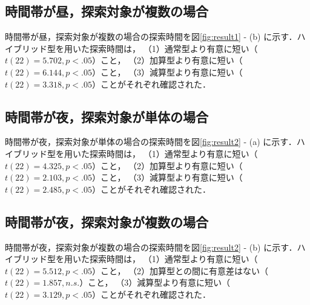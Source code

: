   \subsection{時間帯が昼，探索対象が複数の場合}
    時間帯が昼，探索対象が複数の場合の探索時間を図\ref{fig:result1} - (b) に示す．ハイブリッド型を用いた探索時間は，
    （1）通常型より有意に短い（$t(22)=5.702,p<.05$）こと，
    （2）加算型より有意に短い（$t(22)=6.144,p<.05$）こと，
    （3）減算型より有意に短い（$t(22)=3.318,p<.05$）ことがそれぞれ確認された．

  \subsection{時間帯が夜，探索対象が単体の場合}
    時間帯が夜，探索対象が単体の場合の探索時間を図\ref{fig:result2} - (a) に示す．ハイブリッド型を用いた探索時間は，
    （1）通常型より有意に短い（$t(22)=4.325,p<.05$）こと，
    （2）加算型より有意に短い（$t(22)=2.103,p<.05$）こと，
    （3）減算型より有意に短い（$t(22)=2.485,p<.05$）ことがそれぞれ確認された．

  \subsection{時間帯が夜，探索対象が複数の場合}
    時間帯が夜，探索対象が複数の場合の探索時間を図\ref{fig:result2} - (b) に示す．ハイブリッド型を用いた探索時間は，
    （1）通常型より有意に短い（$t(22)=5.512,p<.05$）こと，
    （2）加算型との間に有意差はない（$t(22)=1.857,n.s.$）こと，
    （3）減算型より有意に短い（$t(22)=3.129,p<.05$）ことがそれぞれ確認された．

